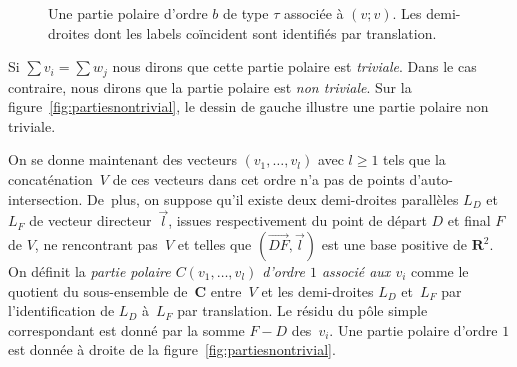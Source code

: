 \documentclass[11pt]{article}
\numberwithin{equation}{section}\renewcommand{\proofname}{Démonstration}
\newcommand{\RR}{\mathbf{R}}
\newcommand{\CC}{\mathbf{C}}
\theoremstyle{definition}
\begin{document}
\begin{figure}[htb]
\caption{Une partie polaire d'ordre $b$ de type $\tau$ associée à $(v;v)$. Les demi-droites dont les labels coïncident sont identifiés par translation.} \label{fig:ordreplusmoins}
\end{figure}

Si $\sum v_{i} =\sum w_{j}$ nous dirons que cette partie polaire est \emph{triviale}. Dans le cas contraire, nous dirons que la partie polaire est \emph{non triviale}. Sur la figure~\ref{fig:partiesnontrivial}, le dessin de gauche illustre une partie polaire non triviale.

On se donne maintenant des vecteurs $(v_{1},\dots,v_{l})$ avec $l\geq1$ tels que la concaténation~$V$ de ces vecteurs dans cet ordre n'a pas de points d'auto-intersection. De~plus, on suppose qu'il existe deux demi-droites parallèles $L_{D}$ et $L_{F}$ de vecteur directeur~$\overrightarrow{l}$, issues respectivement du point de départ $D$ et final $F$ de $V$, ne rencontrant pas~$V$ et telles que $(\overrightarrow{DF},\overrightarrow{l})$ est une base positive de $\RR^{2}$. On définit la \emph{partie polaire $C(v_{1},\dots,v_{l})$ d'ordre $1$ associé aux $v_{i}$} comme le quotient du sous-ensemble de~$\CC$ entre~$V$ et les demi-droites $L_{D}$ et~$L_{F}$ par l'identification de $L_{D}$ à~$L_{F}$ par translation. Le résidu du pôle simple correspondant est donné par la somme $F-D$ des~$v_{i}$. Une partie polaire d'ordre $1$ est donnée à droite de la figure~\ref{fig:partiesnontrivial}.
\end{document}
